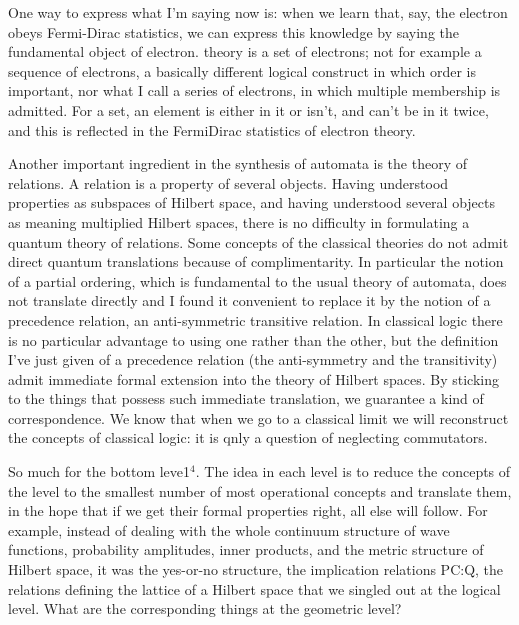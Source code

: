One way to express what I'm saying now is: when we learn that, say, the electron obeys Fermi-Dirac statistics, we can express this knowledge by saying the fundamental object of electron. theory is a set of electrons; not for example a sequence of electrons, a basically different logical construct in which order is important, nor what I call a series of electrons, in which multiple membership is admitted. For a set, an element is either in it or isn't, and can't be in it twice, and this is reflected in the Fermi­Dirac statistics of electron theory.

Another important ingredient in the synthesis of automata is the theory of relations. A relation is a property of several objects. Having understood properties as subspaces of Hilbert space, and having understood several objects as meaning multiplied Hilbert spaces, there is no difficulty in formulating a quantum theory of relations. Some concepts of the classical theories do not admit direct quantum translations because of complimentarity. In particular the notion of a partial ordering, which is fundamental to the usual theory of automata, does not translate directly and I found it convenient to replace it by the notion of a precedence relation, an anti-symmetric transitive relation. In classical logic there is no particular advantage to using one rather than the other, but the definition I've just given of a precedence relation (the anti-symmetry and the transitivity) admit immediate formal extension into the theory of Hilbert spaces. By sticking to the things that possess such immediate translation, we guarantee a kind of correspondence. We know that when we go to a classical limit we will reconstruct the concepts of classical logic: it is qnly a question of neglecting commutators.

So much for the bottom leve1$^4$. The idea in each level is to reduce the concepts of the level to the smallest number of most operational concepts and translate them, in the hope that if we get their formal properties right, all else will follow. For example, instead of dealing with the whole continuum structure of wave functions, probability amplitudes, inner products, and the metric structure of Hilbert space, it was the yes-or-no structure, the implication relations PC:Q, the relations defining the lattice of a Hilbert space
that we singled out at the logical level. What are the
corresponding things at the geometric level?


